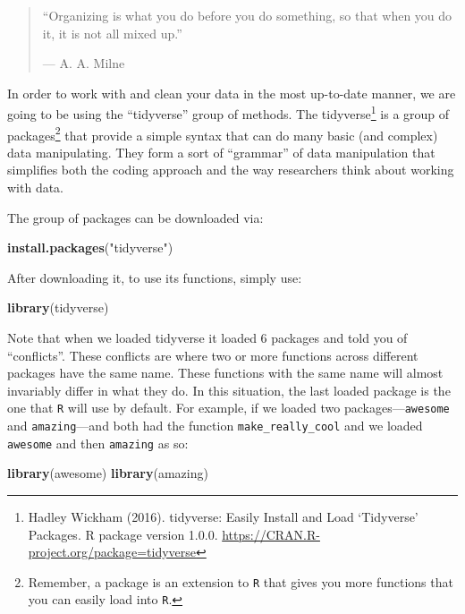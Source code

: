 \documentclass[]{tufte-book}
\newenvironment{Shaded}{}{}
\newcommand{\KeywordTok}[1]{\textcolor[rgb]{0.00,0.44,0.13}{\textbf{#1}}}
\newcommand{\StringTok}[1]{\textcolor[rgb]{0.25,0.44,0.63}{#1}}
\newcommand{\NormalTok}[1]{#1}
\theoremstyle{definition}
\theoremstyle{definition}
\theoremstyle{remark}
\begin{document}
\begin{quote}
``Organizing is what you do before you do something, so that when you do
it, it is not all mixed up.''

--- A. A. Milne
\end{quote}

In order to work with and clean your data in the most up-to-date manner,
we are going to be using the ``tidyverse'' group of methods. The
tidyverse\footnote{Hadley Wickham (2016). tidyverse: Easily Install and
  Load `Tidyverse' Packages. R package version 1.0.0.
  \url{https://CRAN.R-project.org/package=tidyverse}} is a group of
packages\footnote{Remember, a package is an extension to \texttt{R} that
  gives you more functions that you can easily load into \texttt{R}.}
that provide a simple syntax that can do many basic (and complex) data
manipulating. They form a sort of ``grammar'' of data manipulation that
simplifies both the coding approach and the way researchers think about
working with data.

The group of packages can be downloaded via:

\begin{Shaded}
\begin{Highlighting}[]
\KeywordTok{install.packages}\NormalTok{(}\StringTok{"tidyverse"}\NormalTok{)}
\end{Highlighting}
\end{Shaded}

After downloading it, to use its functions, simply use:

\begin{Shaded}
\begin{Highlighting}[]
\KeywordTok{library}\NormalTok{(tidyverse)}
\end{Highlighting}
\end{Shaded}

Note that when we loaded tidyverse it loaded 6 packages and told you of
``conflicts''. These conflicts are where two or more functions across
different packages have the same name. These functions with the same
name will almost invariably differ in what they do. In this situation,
the last loaded package is the one that \texttt{R} will use by default.
For example, if we loaded two packages---\texttt{awesome} and
\texttt{amazing}---and both had the function \texttt{make\_really\_cool}
and we loaded \texttt{awesome} and then \texttt{amazing} as so:

\begin{Shaded}
\begin{Highlighting}[]
\KeywordTok{library}\NormalTok{(awesome)}
\KeywordTok{library}\NormalTok{(amazing)}
\end{Highlighting}
\end{Shaded}
\end{document}
